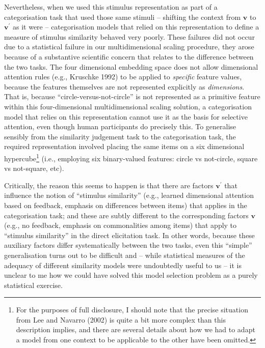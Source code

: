 \documentclass[doc]{apa6}
\let\rmarkdownfootnote\footnote%
\def\footnote{\protect\rmarkdownfootnote}
\theoremstyle{definition}
\theoremstyle{definition}
\theoremstyle{definition}
\theoremstyle{remark}
\begin{document}
Nevertheless, when we used this stimulus representation as part of a
categorisation task that used those same stimuli -- shifting the context
from \(\bm{v}\) to \(\bm{v}^\prime\) as it were -- categorisation models
that relied on this representation to define a measure of stimulus
similarity behaved very poorly. These failures did not occur due to a
statistical failure in our multidimensional scaling procedure, they
arose because of a substantive scientific concern that relates to the
difference between the two tasks. The four dimensional embedding space
does not allow dimensional attention rules (e.g., Kruschke 1992) to be
applied to \emph{specific} feature values, because the features
themselves are not represented explicitly as \emph{dimensions}. That is,
because \enquote{circle-versus-not-circle} is not represented as a
primitive feature within this four-dimensional multidimensional scaling
solution, a categorisation model that relies on this representation
cannot use it as the basis for selective attention, even though human
participants do precisely this. To generalise sensibly from the
similarity judgement task to the categorisation task, the required
representation involved placing the same items on a six dimensional
hypercube\footnote{For the purposes of full disclosure, I should note
  that the precise situation from Lee and Navarro (2002) is quite a bit
  more complex than this description implies, and there are several
  details about how we had to adapt a model from one context to be
  applicable to the other have been omitted.} (i.e., employing six
binary-valued features: circle vs not-circle, square vs not-square,
etc).

Critically, the reason this seems to happen is that there are factors
\(\bm{v}^\prime\) that influence the notion of \enquote{stimulus
similarity} (e.g., learned dimensional attention based on feedback,
emphasis on differences between items) that applies in the
categorisation task; and these are subtly different to the corresponding
factors \(\bm{v}\) (e.g., no feedback, emphasis on commonalities among
items) that apply to \enquote{stimulus similarity} in the direct
elicitation task. In other words, because these auxiliary factors differ
systematically between the two tasks, even this \enquote{simple}
generalisation turns out to be difficult and -- while statistical
measures of the adequacy of different similarity models were undoubtedly
useful to us -- it is unclear to me how we could have solved this model
selection problem as a purely statistical exercise.
\end{document}
